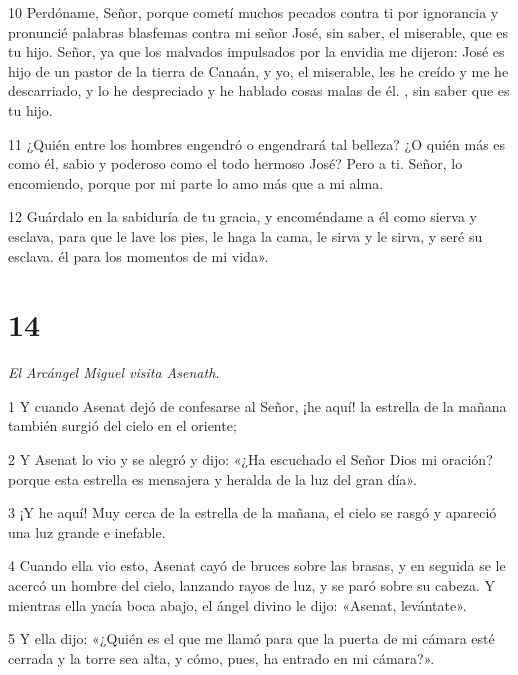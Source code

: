 \par 10 Perdóname, Señor, porque cometí muchos pecados contra ti por ignorancia y pronuncié palabras blasfemas contra mi señor José, sin saber, el miserable, que es tu hijo. Señor, ya que los malvados impulsados ​​por la envidia me dijeron: José es hijo de un pastor de la tierra de Canaán, y yo, el miserable, les he creído y me he descarriado, y lo he despreciado y he hablado cosas malas de él. , sin saber que es tu hijo.

\par 11 ¿Quién entre los hombres engendró o engendrará tal belleza? ¿O quién más es como él, sabio y poderoso como el todo hermoso José? Pero a ti. Señor, lo encomiendo, porque por mi parte lo amo más que a mi alma.

\par 12 Guárdalo en la sabiduría de tu gracia, y encoméndame a él como sierva y esclava, para que le lave los pies, le haga la cama, le sirva y le sirva, y seré su esclava. él para los momentos de mi vida».

\chapter{14}

\par \textit{El Arcángel Miguel visita Asenath.}

\par 1 Y cuando Asenat dejó de confesarse al Señor, ¡he aquí! la estrella de la mañana también surgió del cielo en el oriente;

\par 2 Y Asenat lo vio y se alegró y dijo: «¿Ha escuchado el Señor Dios mi oración? porque esta estrella es mensajera y heralda de la luz del gran día».

\par 3 ¡Y he aquí! Muy cerca de la estrella de la mañana, el cielo se rasgó y apareció una luz grande e inefable.

\par 4 Cuando ella vio esto, Asenat cayó de bruces sobre las brasas, y en seguida se le acercó un hombre del cielo, lanzando rayos de luz, y se paró sobre su cabeza. Y mientras ella yacía boca abajo, el ángel divino le dijo: «Asenat, levántate».

\par 5 Y ella dijo: «¿Quién es el que me llamó para que la puerta de mi cámara esté cerrada y la torre sea alta, y cómo, pues, ha entrado en mi cámara?».

